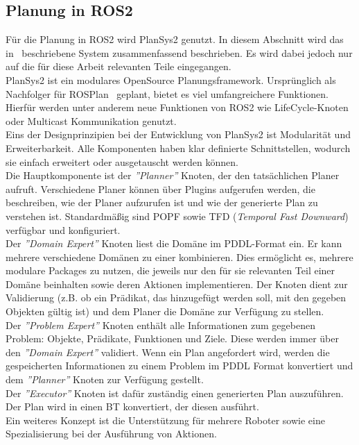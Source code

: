\subsection{Planung in \ac{ROS2}}
Für die Planung in \ac{ROS2} wird \ac{PlanSys2} genutzt.
In diesem Abschnitt wird das in~\cite{plansys} beschriebene System zusammenfassend beschrieben.
Es wird dabei jedoch nur auf die für diese Arbeit relevanten Teile eingegangen.\\
\ac{PlanSys2} ist ein modulares OpenSource Planungsframework.
Ursprünglich als Nachfolger für ROSPlan~\cite{rosplan} geplant, bietet es viel umfangreichere Funktionen.
Hierfür werden unter anderem neue Funktionen von \ac{ROS2} wie LifeCycle-Knoten oder Multicast Kommunikation genutzt.\\
Eins der Designprinzipien bei der Entwicklung von \ac{PlanSys2} ist Modularität und Erweiterbarkeit.
Alle Komponenten haben klar definierte Schnittstellen, wodurch sie einfach erweitert oder ausgetauscht werden können.\\
Die Hauptkomponente ist der \emph{''Planner''} Knoten, der den tatsächlichen Planer aufruft.
Verschiedene Planer können über Plugins aufgerufen werden, die beschreiben, wie der Planer aufzurufen ist und wie der generierte Plan zu verstehen ist.
Standardmäßig sind \ac{POPF} sowie TFD (\emph{Temporal Fast Downward})~\cite{tfd} verfügbar und konfiguriert.\\
Der \emph{''Domain Expert''} Knoten liest die Domäne im \ac{PDDL}-Format ein.
Er kann mehrere verschiedene Domänen zu einer kombinieren.
Dies ermöglicht es, mehrere modulare Packages zu nutzen, die jeweils nur den für sie relevanten Teil einer Domäne beinhalten sowie deren Aktionen  implementieren.
Der Knoten dient zur Validierung (z.B. ob ein Prädikat, das hinzugefügt werden soll, mit den gegeben Objekten gültig ist) und dem Planer die Domäne zur Verfügung zu stellen.\\
Der \emph{''Problem Expert''} Knoten enthält alle Informationen zum gegebenen Problem: Objekte, Prädikate, Funktionen und Ziele.
Diese werden immer über den \emph{''Domain Expert''} validiert.
Wenn ein Plan angefordert wird, werden die gespeicherten Informationen zu einem Problem im \ac{PDDL} Format konvertiert und dem \emph{''Planner''} Knoten zur Verfügung gestellt.\\
Der \emph{''Executor''} Knoten ist dafür zuständig einen generierten Plan auszuführen.
Der Plan wird in einen \ac{BT} konvertiert, der diesen ausführt.\\
Ein weiteres Konzept ist die Unterstützung für mehrere Roboter sowie eine Spezialisierung bei der Ausführung von Aktionen.
